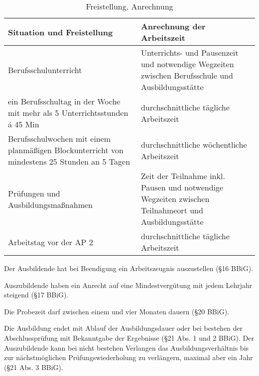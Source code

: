 \begin{table}[H]
    \centering
    \begin{tabularx}{\textwidth}{|>{\raggedright\arraybackslash}X|>{\raggedright\arraybackslash}X|}
        \hline
        Situation und Freistellung                                                                   & Anrechnung der Arbeitszeit                                                                           \\
        \hline
        Berufsschulunterricht                                                                        & Unterrichts- und Pausenzeit und notwendige Wegzeiten zwischen Berufsschule und Ausbildungsstätte     \\
        \hline
        ein Berufsschultag in der Woche mit mehr als 5 Unterrichtsstunden á 45 Min                   & durchschnittliche tägliche Arbeitszeit                                                               \\
        \hline
        Berufsschulwochen mit einem planmäßigen Blockunterricht von mindestens 25 Stunden an 5 Tagen & durchschnittliche wöchentliche Arbeitszeit                                                           \\
        \hline
        Prüfungen und Ausbildungsmaßnahmen                                                           & Zeit der Teilnahme inkl. Pausen und notwendige Wegzeiten zwischen Teilnahmeort und Ausbildungsstätte \\
        \hline
        Arbeitstag vor der AP 2                                                                      & durchschnittliche tägliche Arbeitszeit                                                               \\
        \hline
    \end{tabularx}
    \caption{Freistellung, Anrechnung}
    \label{tab:freistellung}
\end{table}

Der Ausbildende hat bei Beendigung ein Arbeitszeugnis auszustellen (§16 BBiG).

Auszubildende haben ein Anrecht auf eine Mindestvergütung mit jedem Lehrjahr steigend (§17 BBiG).

Die Probezeit darf zwischen einem und vier Monaten dauern (§20 BBiG).

Die Ausbildung endet mit Ablauf der Ausbildungsdauer oder bei bestehen der Abschlussprüfung mit Bekanntgabe der Ergebnisse (§21 Abs. 1 und 2 BBiG). Der Auszubildende kann bei nicht bestehen Verlangen das Ausbildungsverhältnis bis zur nächstmöglichen Prüfungswiederholung zu verlängern, maximal aber ein Jahr (§21 Abs. 3 BBiG).

